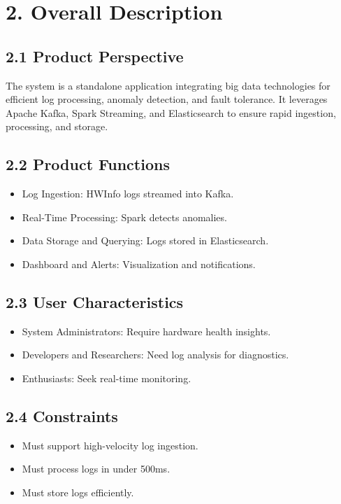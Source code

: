 \documentclass[a4paper,12pt]{report}
\begin{document}
\section{2. Overall Description}

\subsection{2.1 Product Perspective}
The system is a standalone application integrating big data technologies for efficient log processing, anomaly detection, and fault tolerance. It leverages Apache Kafka, Spark Streaming, and Elasticsearch to ensure rapid ingestion, processing, and storage.

\subsection{2.2 Product Functions}
\begin{itemize}
    \item Log Ingestion: HWInfo logs streamed into Kafka.
    \item Real-Time Processing: Spark detects anomalies.
    \item Data Storage and Querying: Logs stored in Elasticsearch.
    \item Dashboard and Alerts: Visualization and notifications.
\end{itemize}

\subsection{2.3 User Characteristics}
\begin{itemize}
    \item System Administrators: Require hardware health insights.
    \item Developers and Researchers: Need log analysis for diagnostics.
    \item Enthusiasts: Seek real-time monitoring.
\end{itemize}

\subsection{2.4 Constraints}
\begin{itemize}
    \item Must support high-velocity log ingestion.
    \item Must process logs in under 500ms.
    \item Must store logs efficiently.
\end{itemize}
\end{document}
